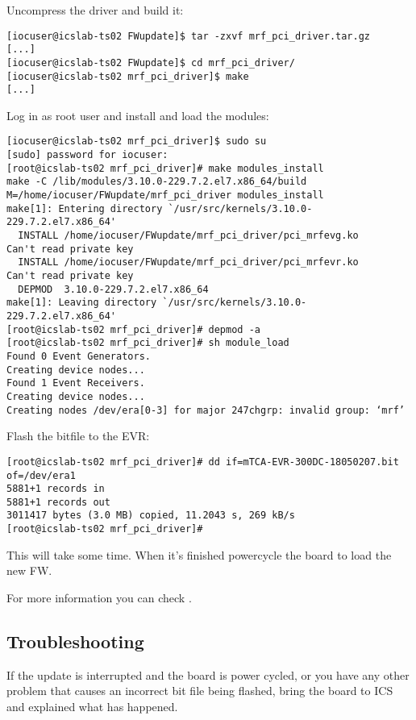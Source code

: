 \documentclass[11pt
  , a4paper
  , article
  , oneside
  , showtrims
]{memoir}
\begin{document}
Uncompress the driver and build it:
\begin{lstlisting}[style=termstyle]
[iocuser@icslab-ts02 FWupdate]$ tar -zxvf mrf_pci_driver.tar.gz
[...]
[iocuser@icslab-ts02 FWupdate]$ cd mrf_pci_driver/
[iocuser@icslab-ts02 mrf_pci_driver]$ make
[...]
\end{lstlisting}
Log in as root user and install and load the modules:
\begin{lstlisting}[style=termstyle]
[iocuser@icslab-ts02 mrf_pci_driver]$ sudo su
[sudo] password for iocuser:
[root@icslab-ts02 mrf_pci_driver]# make modules_install
make -C /lib/modules/3.10.0-229.7.2.el7.x86_64/build M=/home/iocuser/FWupdate/mrf_pci_driver modules_install
make[1]: Entering directory `/usr/src/kernels/3.10.0-229.7.2.el7.x86_64'
  INSTALL /home/iocuser/FWupdate/mrf_pci_driver/pci_mrfevg.ko
Can't read private key
  INSTALL /home/iocuser/FWupdate/mrf_pci_driver/pci_mrfevr.ko
Can't read private key
  DEPMOD  3.10.0-229.7.2.el7.x86_64
make[1]: Leaving directory `/usr/src/kernels/3.10.0-229.7.2.el7.x86_64'
[root@icslab-ts02 mrf_pci_driver]# depmod -a
[root@icslab-ts02 mrf_pci_driver]# sh module_load
Found 0 Event Generators.
Creating device nodes...
Found 1 Event Receivers.
Creating device nodes...
Creating nodes /dev/era[0-3] for major 247chgrp: invalid group: ‘mrf’
\end{lstlisting}
Flash the bitfile to the EVR:
\begin{lstlisting}[style=termstyle]
[root@icslab-ts02 mrf_pci_driver]# dd if=mTCA-EVR-300DC-18050207.bit of=/dev/era1
5881+1 records in
5881+1 records out
3011417 bytes (3.0 MB) copied, 11.2043 s, 269 kB/s
[root@icslab-ts02 mrf_pci_driver]#
\end{lstlisting}
This will take some time. When it's finished powercycle the board to load the new FW.

For more information you can check \citep{MRFKERNELDRIVER}.

\subsection{Troubleshooting}
If the update is interrupted and the board is power cycled, or you have any other problem that causes an incorrect bit file being flashed, bring the board to ICS and explained what has happened.










\clearpage

\backmatter
%
%
%

%
%

\end{document}
